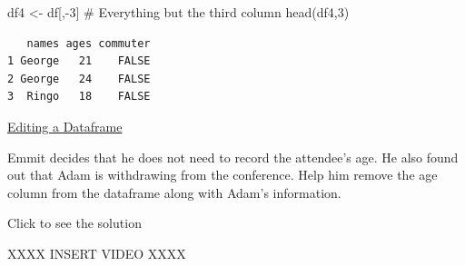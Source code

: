 \documentclass[
  letterpaper,
  DIV=11,
  numbers=noendperiod]{scrreprt}
\newenvironment{Shaded}{\begin{snugshade}}{\end{snugshade}}
\newcommand{\CommentTok}[1]{\textcolor[rgb]{0.37,0.37,0.37}{#1}}
\newcommand{\DecValTok}[1]{\textcolor[rgb]{0.68,0.00,0.00}{#1}}
\newcommand{\FunctionTok}[1]{\textcolor[rgb]{0.28,0.35,0.67}{#1}}
\newcommand{\NormalTok}[1]{\textcolor[rgb]{0.00,0.23,0.31}{#1}}
\newcommand{\OtherTok}[1]{\textcolor[rgb]{0.00,0.23,0.31}{#1}}
\newcommand{\SpecialCharTok}[1]{\textcolor[rgb]{0.37,0.37,0.37}{#1}}
\begin{document}
\begin{Shaded}
\begin{Highlighting}[]
\NormalTok{df4 }\OtherTok{\textless{}{-}}\NormalTok{ df[,}\SpecialCharTok{{-}}\DecValTok{3}\NormalTok{] }\CommentTok{\# Everything but the third column}
\FunctionTok{head}\NormalTok{(df4,}\DecValTok{3}\NormalTok{)}
\end{Highlighting}
\end{Shaded}

\begin{verbatim}
   names ages commuter
1 George   21    FALSE
2 George   24    FALSE
3  Ringo   18    FALSE
\end{verbatim}

\begin{watch}{}{}
    \href{https://youtu.be/us5M1ekgwUE}{Editing a Dataframe}
\end{watch}

\begin{tcolorbox}[enhanced jigsaw, colbacktitle=quarto-callout-tip-color!10!white, breakable, bottomrule=.15mm, colframe=quarto-callout-tip-color-frame, left=2mm, opacitybacktitle=0.6, title=\textcolor{quarto-callout-tip-color}{\faLightbulb}\hspace{0.5em}{Try it Out}, leftrule=.75mm, opacityback=0, rightrule=.15mm, titlerule=0mm, bottomtitle=1mm, colback=white, toprule=.15mm, arc=.35mm, toptitle=1mm, coltitle=black]

Emmit decides that he does not need to record the attendee's age. He
also found out that Adam is withdrawing from the conference. Help him
remove the age column from the dataframe along with Adam's information.

Click to see the solution

XXXX INSERT VIDEO XXXX

\end{tcolorbox}
\end{document}
